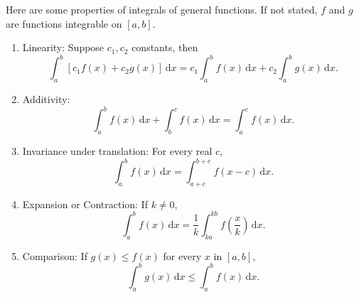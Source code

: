 	\begin{theoremenv}
		Here are some properties of integrals of general functions. If not stated, $f$ and $g$ are functions integrable on $[a,b]$.
		\begin{enumerate}
			\item Linearity: Suppose $c_1,c_2$ constants, then
			\[
			\int_a^b \left[ c_1 f(x) + c_2 g(x) \right] \, \mathrm{d}x
			= c_1 \int_a^b f(x) \, \mathrm{d}x
			+ c_2 \int_a^b g(x) \, \mathrm{d}x.
			\]
			\item Additivity:
			\[
			\int_a^b f(x) \, \mathrm{d}x
			+ \int_b^c f(x) \, \mathrm{d}x
			= \int_a^c f(x) \, \mathrm{d}x.
			\]
			\item Invariance under translation: For every real $c$,
			\[
			\int_a^b f(x) \, \mathrm{d}x
			= \int_{a+c}^{b+c} f(x - c) \, \mathrm{d}x.
			\]
			\item Expansion or Contraction: If $k\neq 0$,
			\[
			\int_a^b f(x) \, \mathrm{d}x
			= \frac{1}{k} \int_{ka}^{kb} f\!\left( \frac{x}{k} \right) \, \mathrm{d}x.
			\]
			\item Comparison: If $g(x)\le f(x)$ for every $x$ in $[a,b]$,
			\[
			\int_a^b g(x) \, \mathrm{d}x
			\le \int_a^b f(x) \, \mathrm{d}x.
			\]
		\end{enumerate}
	\end{theoremenv}
